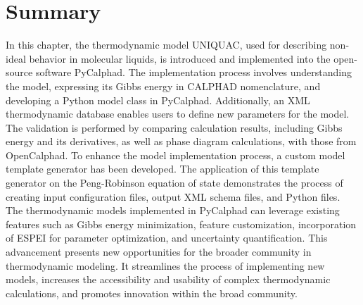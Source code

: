 \section{Summary} \label{models:sec:Summary}
In this chapter, the thermodynamic model UNIQUAC, used for describing non-ideal behavior in molecular liquids, is introduced and implemented into the open-source software PyCalphad. The implementation process involves understanding the model, expressing its Gibbs energy in CALPHAD nomenclature, and developing a Python model class in PyCalphad. Additionally, an XML thermodynamic database enables users to define new parameters for the model. The validation is performed by comparing calculation results, including Gibbs energy and its derivatives, as well as phase diagram calculations, with those from OpenCalphad. To enhance the model implementation process, a custom model template generator has been developed. The application of this template generator on the Peng-Robinson equation of state demonstrates the process of creating input configuration files, output XML schema files, and Python files. The thermodynamic models implemented in PyCalphad can leverage existing features such as Gibbs energy minimization, feature customization, incorporation of ESPEI for parameter optimization, and uncertainty quantification. This advancement presents new opportunities for the broader community in thermodynamic modeling. It streamlines the process of implementing new models, increases the accessibility and usability of complex thermodynamic calculations, and promotes innovation within the broad community.